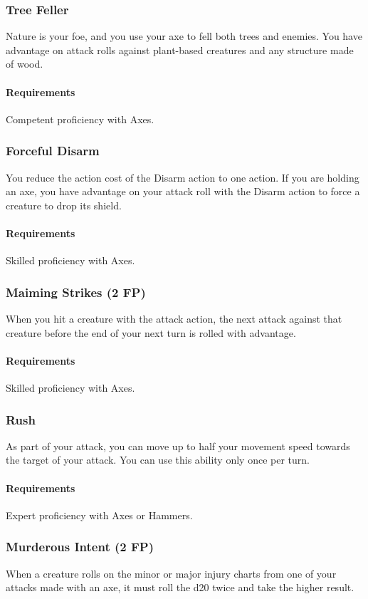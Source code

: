 \subsubsection{Tree Feller} \label{feat::treefeller}
    Nature is your foe, and you use your axe to fell both trees and enemies.
    You have advantage on attack rolls against plant-based creatures and any structure made of wood.
    \paragraph{Requirements} Competent proficiency with Axes.
\subsubsection{Forceful Disarm} \label{feat::forcefuldisarm}
    You reduce the action cost of the Disarm action to one action.
    If you are holding an axe, you have advantage on your attack roll with the Disarm action to force a creature to drop its shield.
    \paragraph{Requirements} Skilled proficiency with Axes.
\subsubsection{Maiming Strikes (2 FP)} \label{feat::maimingstrikes}
    When you hit a creature with the attack action, the next attack against that creature before the end of your next turn is rolled with advantage.
    \paragraph{Requirements} Skilled proficiency with Axes.
\subsubsection{Rush} \label{feat::rush}
    As part of your attack, you can move up to half your movement speed towards the target of your attack.
    You can use this ability only once per turn.
    \paragraph{Requirements} Expert proficiency with Axes or Hammers.
\subsubsection{Murderous Intent (2 FP)} \label{feat::murderousintent}
    When a creature rolls on the minor or major injury charts from one of your attacks made with an axe, it must roll the d20 twice and take the higher result.
